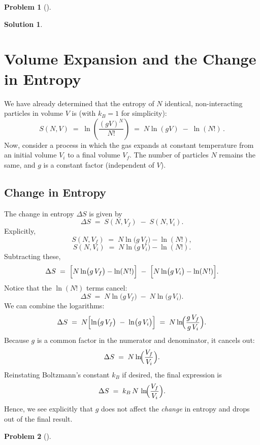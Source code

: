 \documentclass[12pt]{article}
\theoremstyle{definition} %
\newtheorem{solution}{Solution}
\newtheorem{problem}{Problem}
\theoremstyle{plain} %
\begin{document}
\begin{problem}[]
    
\end{problem}
\begin{solution}
    \section*{Volume Expansion and the Change in Entropy}

We have already determined that the entropy of $N$ identical, 
non-interacting particles in volume $V$ is (with $k_B=1$ for simplicity):
\[
S(N,V) \;=\; \ln \left(\frac{(gV)^N}{N!}\right) 
\;=\; N \ln(gV) \;-\; \ln(N!)\,.
\]
Now, consider a process in which the gas expands at constant temperature 
from an initial volume $V_i$ to a final volume $V_f$. The number of 
particles $N$ remains the same, and $g$ is a constant factor 
(independent of $V$). 

\subsection*{Change in Entropy}

The change in entropy $\Delta S$ is given by
\[
\Delta S \;=\; S(N,V_f) \;-\; S(N,V_i).
\]
Explicitly,
\[
S(N,V_f) \;=\; N \ln\bigl(g\,V_f\bigr) - \ln(N!),
\]
\[
S(N,V_i) \;=\; N \ln\bigl(g\,V_i\bigr) - \ln(N!).
\]
Subtracting these,
\[
\Delta S \;=\; \Bigl[N \ln\bigl(g\,V_f\bigr) - \ln(N!)\Bigr] 
\;-\; \Bigl[N \ln\bigl(g\,V_i\bigr) - \ln(N!)\Bigr].
\]
Notice that the $\ln(N!)$ terms cancel:
\[
\Delta S \;=\; N \ln\bigl(g\,V_f\bigr) 
\;-\; N \ln\bigl(g\,V_i\bigr).
\]
We can combine the logarithms:
\[
\Delta S \;=\; N \Bigl[\ln\bigl(g\,V_f\bigr) 
\;-\; \ln\bigl(g\,V_i\bigr)\Bigr]
\;=\; N \ln\!\Bigl(\frac{g\,V_f}{g\,V_i}\Bigr).
\]
Because $g$ is a common factor in the numerator and denominator, it cancels out:
\[
\Delta S \;=\; N \ln\!\Bigl(\frac{V_f}{V_i}\Bigr).
\]
Reinstating Boltzmann's constant $k_B$ if desired, the final expression is
\[
\Delta S \;=\; k_B \, N \,\ln\!\Bigl(\frac{V_f}{V_i}\Bigr).
\]
Hence, we see explicitly that $g$ does not affect the \emph{change} 
in entropy and drops out of the final result.

\end{solution}
\begin{problem}[]
    
\end{problem}
\end{document}
